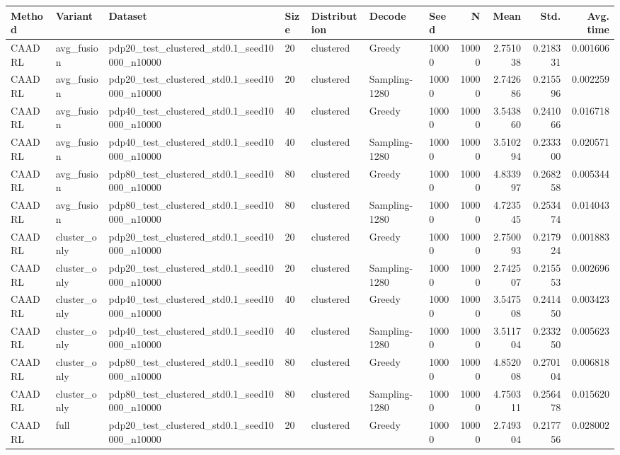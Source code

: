 \begin{tabular}{lllllllrrrr}\toprule
Method & Variant & Dataset & Size & Distribution & Decode & Seed & N & Mean & Std. & Avg. time \\
\midrule
CAADRL & avg_fusion & pdp20_test_clustered_std0.1_seed10000_n10000 & 20 & clustered & Greedy & 10000 & 10000 & 2.751038 & 0.218331 & 0.001606 \\
CAADRL & avg_fusion & pdp20_test_clustered_std0.1_seed10000_n10000 & 20 & clustered & Sampling-1280 & 10000 & 10000 & 2.742686 & 0.215596 & 0.002259 \\
CAADRL & avg_fusion & pdp40_test_clustered_std0.1_seed10000_n10000 & 40 & clustered & Greedy & 10000 & 10000 & 3.543860 & 0.241066 & 0.016718 \\
CAADRL & avg_fusion & pdp40_test_clustered_std0.1_seed10000_n10000 & 40 & clustered & Sampling-1280 & 10000 & 10000 & 3.510294 & 0.233300 & 0.020571 \\
CAADRL & avg_fusion & pdp80_test_clustered_std0.1_seed10000_n10000 & 80 & clustered & Greedy & 10000 & 10000 & 4.833997 & 0.268258 & 0.005344 \\
CAADRL & avg_fusion & pdp80_test_clustered_std0.1_seed10000_n10000 & 80 & clustered & Sampling-1280 & 10000 & 10000 & 4.723545 & 0.253474 & 0.014043 \\
CAADRL & cluster_only & pdp20_test_clustered_std0.1_seed10000_n10000 & 20 & clustered & Greedy & 10000 & 10000 & 2.750093 & 0.217924 & 0.001883 \\
CAADRL & cluster_only & pdp20_test_clustered_std0.1_seed10000_n10000 & 20 & clustered & Sampling-1280 & 10000 & 10000 & 2.742507 & 0.215553 & 0.002696 \\
CAADRL & cluster_only & pdp40_test_clustered_std0.1_seed10000_n10000 & 40 & clustered & Greedy & 10000 & 10000 & 3.547508 & 0.241450 & 0.003423 \\
CAADRL & cluster_only & pdp40_test_clustered_std0.1_seed10000_n10000 & 40 & clustered & Sampling-1280 & 10000 & 10000 & 3.511704 & 0.233250 & 0.005623 \\
CAADRL & cluster_only & pdp80_test_clustered_std0.1_seed10000_n10000 & 80 & clustered & Greedy & 10000 & 10000 & 4.852008 & 0.270104 & 0.006818 \\
CAADRL & cluster_only & pdp80_test_clustered_std0.1_seed10000_n10000 & 80 & clustered & Sampling-1280 & 10000 & 10000 & 4.750311 & 0.256478 & 0.015620 \\
CAADRL & full & pdp20_test_clustered_std0.1_seed10000_n10000 & 20 & clustered & Greedy & 10000 & 10000 & 2.749304 & 0.217756 & 0.028002 \\

\end{tabular}
